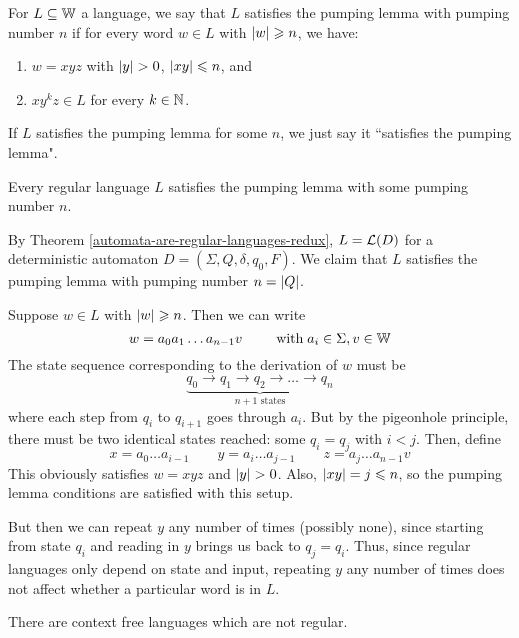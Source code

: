 \documentclass{article}
\begin{document}
For $L \subseteq \mathbb{W}$ a language, we say that $L$ satisfies the pumping lemma with pumping number $n$ if for every word $w \in L$ with $\left\lvert w \right\rvert \geqslant n$, we have:
\begin{enumerate}
	\item $w = xyz$ with $\left\lvert y \right\rvert > 0$, $\left\lvert xy \right\rvert \leqslant n$, and
	\item $xy^kz \in L$ for every $k \in \mathbb{N}$.
\end{enumerate}

\begin{note}
	If $L$ satisfies the pumping lemma for some $n$, we just say it ``satisfies the pumping lemma".
\end{note}

\begin{theorem}
	\label{regular-pumping-lemma}
	Every regular language $L$ satisfies the pumping lemma with some pumping number $n$.
\end{theorem}

\begin{prf}
	By Theorem \ref{automata-are-regular-languages-redux}, $L = \mathcal{L}(D)$ for a deterministic automaton $D = (\Sigma, Q, \delta, q_0, F)$. We claim that $L$ satisfies the pumping lemma with pumping number $n = \left\lvert Q \right\rvert$.
	    
	Suppose $w \in L$ with $\left\lvert w \right\rvert \geqslant n$. Then we can write
	\[
		w = a_0 a_1 \dots a_{n-1} v \qquad \mathrel{\, \text{with}} a_i \in \Sigma, v \in \mathbb{W}
	\]
	The state sequence corresponding to the derivation of $w$ must be
	\[
		\underbrace{q_0 \to q_1 \to q_2 \to \dots \to q_n}_{n+1 \text{ states}}
	\]
	where each step from $q_i$ to $q_{i+1}$ goes through $a_i$. But by the pigeonhole principle, there must be two identical states reached: some $q_i = q_j$ with $i < j$. Then, define
	\[
		x = a_0 \dots a_{i-1} \qquad y = a_i \dots a_{j-1} \qquad z = a_j \dots a_{n-1} v
	\]
	This obviously satisfies $w = xyz$ and $\left\lvert y \right\rvert > 0$. Also, $\left\lvert xy \right\rvert = j \leqslant n$, so the pumping lemma conditions are satisfied with this setup.
		
	But then we can repeat $y$ any number of times (possibly none), since starting from state $q_i$ and reading in $y$ brings us back to $q_j = q_i$. Thus, since regular languages only depend on state and input, repeating $y$ any number of times does not affect whether a particular word is in $L$.
\end{prf}

\begin{corollary}
	There are context free languages which are not regular.
\end{corollary}
\end{document}

